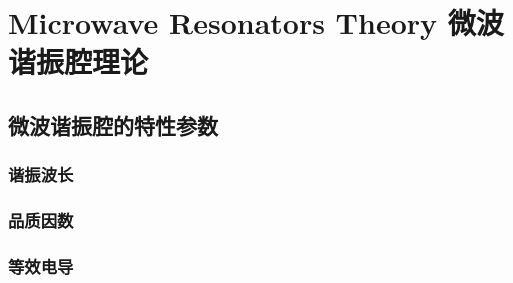 \chapter{Microwave Resonators Theory 微波谐振腔理论}
\section{微波谐振腔的特性参数}
    \subsection{谐振波长}
    \subsection{品质因数}
    \subsection{等效电导}


